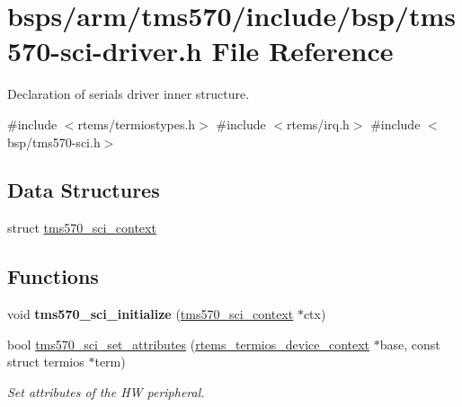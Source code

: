 \hypertarget{tms570-sci-driver_8h}{}\section{bsps/arm/tms570/include/bsp/tms570-\/sci-\/driver.h File Reference}
\label{tms570-sci-driver_8h}


Declaration of serial\textquotesingle{}s driver inner structure.  


{\ttfamily \#include $<$rtems/termiostypes.\+h$>$}\newline
{\ttfamily \#include $<$rtems/irq.\+h$>$}\newline
{\ttfamily \#include $<$bsp/tms570-\/sci.\+h$>$}\newline
\subsection*{Data Structures}
\begin{DoxyCompactItemize}
\item 
struct \mbox{\hyperlink{structtms570__sci__context}{tms570\+\_\+sci\+\_\+context}}
\end{DoxyCompactItemize}
\subsection*{Functions}
\begin{DoxyCompactItemize}
\item 
\mbox{\label{tms570-sci-driver_8h_ae9a4d3192f3e78b9857788a98bb14187}} 
void {\bfseries tms570\+\_\+sci\+\_\+initialize} (\mbox{\hyperlink{structtms570__sci__context}{tms570\+\_\+sci\+\_\+context}} $\ast$ctx)
\item 
bool \mbox{\hyperlink{tms570-sci-driver_8h_a73848a263fd0b87c4ab8f1e151239fc5}{tms570\+\_\+sci\+\_\+set\+\_\+attributes}} (\mbox{\hyperlink{structrtems__termios__device__context}{rtems\+\_\+termios\+\_\+device\+\_\+context}} $\ast$base, const struct termios $\ast$term)
\begin{DoxyCompactList}\small\item\em Set attributes of the HW peripheral. \end{DoxyCompactList}\end{DoxyCompactItemize}
